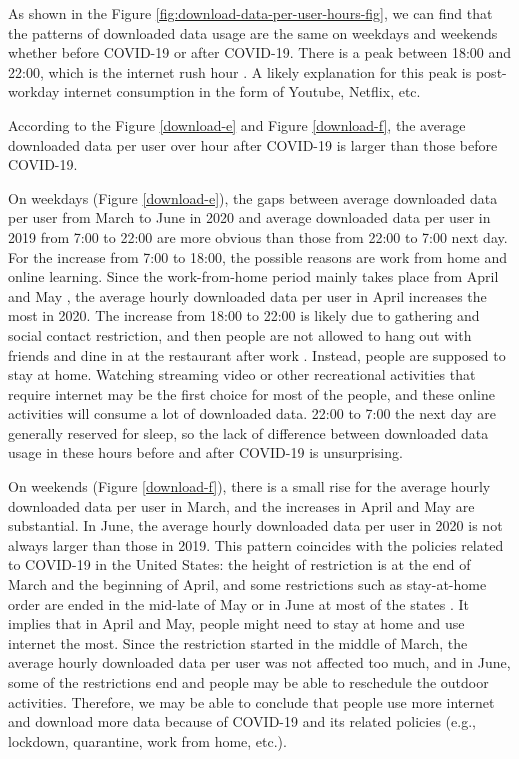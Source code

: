 
As shown in the Figure \ref{fig:download-data-per-user-hours-fig}, we can find that the patterns of downloaded data usage are the same on weekdays and weekends whether before COVID-19 or after COVID-19. There is a peak between 18:00 and 22:00, which is the internet rush hour \cite{internetrushhour}. A likely explanation for this peak is post-workday internet consumption in the form of Youtube, Netflix, etc. 

According to the Figure \ref{download-e} and Figure \ref{download-f}, the average downloaded data per user over hour after COVID-19 is larger than those before COVID-19. 

On weekdays (Figure \ref{download-e}), the gaps between average downloaded data per user from March to June in 2020 and average downloaded data per user in 2019 from 7:00 to 22:00 are more obvious than those from 22:00 to 7:00 next day. For the increase from 7:00 to 18:00, the possible reasons are work from home and online learning. Since the work-from-home period mainly takes place from April and May \cite{remotework}, the average hourly downloaded data per user in April increases the most in 2020. The increase from 18:00 to 22:00 is likely due to gathering and social contact restriction, and then people are not allowed to hang out with friends and dine in at the restaurant after work \cite{lockdownsguide}. Instead, people are supposed to stay at home. Watching streaming video or other recreational activities that require internet may be the first choice for most of the people, and these online activities will consume a lot of downloaded data. 22:00 to 7:00 the next day are generally reserved for sleep, so the lack of difference between downloaded data usage in these hours before and after COVID-19 is unsurprising. 

On weekends (Figure \ref{download-f}), there is a small rise for the average hourly downloaded data per user in March, and the increases in April and May are substantial. In June, the average hourly downloaded data per user in 2020 is not always larger than those in 2019. This pattern coincides with the policies related to COVID-19 in the United States: the height of restriction is at the end of March and the beginning of April, and some restrictions such as stay-at-home order are ended in the mid-late of May or in June at most of the states \cite{covid19restriction}. It 
implies that in April and May, people might need to stay at home and use internet the most. Since the restriction started in the middle of March, the average hourly downloaded data per user was not affected too much, and in June, some of the restrictions end and people may be able to reschedule the outdoor activities. Therefore, we may be able to conclude that people use more internet and download more data because of COVID-19 and its related policies (e.g., lockdown, quarantine, work from home, etc.). 


